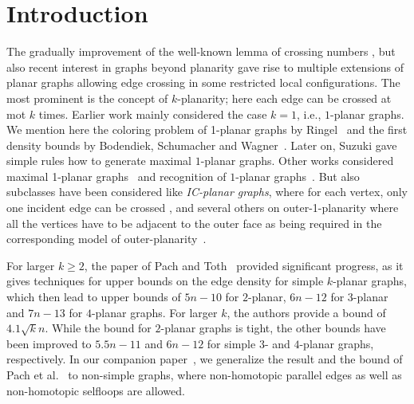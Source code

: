 \section{Introduction}
\label{sec:introduction}

The gradually improvement of the well-known lemma of crossing numbers \cite{ACNS82,Lei83}, but also recent interest in graphs beyond planarity gave rise to multiple extensions of planar graphs allowing edge crossing in some restricted local configurations. The most prominent is the concept of $k$-planarity; here each edge can be crossed at mot $k$ times. Earlier work mainly considered the case $k=1$, i.e., $1$-planar graphs. We mention here the coloring problem of 1-planar graphs by Ringel~\cite{Ringel65} and the first density bounds by Bodendiek, Schumacher and Wagner~\cite{BSW84}. Later on, Suzuki \cite{DBLP:journals/siamdm/Suzuki10} gave simple rules how to generate maximal $1$-planar graphs. Other works considered maximal 1-planar graphs~\cite {DBLP:conf/gd/BrandenburgEGGHR12} and recognition of $1$-planar graphs~\cite{DBLP:journals/corr/Brandenburg16a}. But also subclasses have been considered like \emph{IC-planar graphs}, where for each vertex, only one incident edge can be crossed \cite{DBLP:conf/gd/BrandenburgDEKL15}, and several others on outer-1-planarity where all the vertices have to be adjacent to the outer face as being required in the corresponding model of outer-planarity~\cite{DBLP:journals/algorithmica/HongEKLSS15,DBLP:journals/jgaa/GiacomoLM15,DBLP:journals/algorithmica/AuerBBGHNR16}.

For larger $k \geq 2$, the paper of Pach and Toth~\cite{PachT97} provided significant progress, as it gives techniques for upper bounds on the edge density for simple $k$-planar graphs, which then lead to upper bounds of $5n -10$ for $2$-planar, $6n -12$ for $3$-planar and $7n-13$ for $4$-planar graphs. For larger $k$, the authors provide a bound of $4.1 \sqrt k n$. While the bound for $2$-planar graphs is tight, the other bounds have been improved to $5.5n - 11$ \cite{PachRTT06} and $6n-12$ \cite{DBLP:journals/corr/Ackerman15} for simple $3$- and $4$-planar graphs, respectively. In our companion paper~\cite{BKR16}, we generalize the result and the bound of Pach et al.~\cite{PachRTT06} to non-simple graphs, where non-homotopic parallel edges as well as non-homotopic selfloops are allowed.

